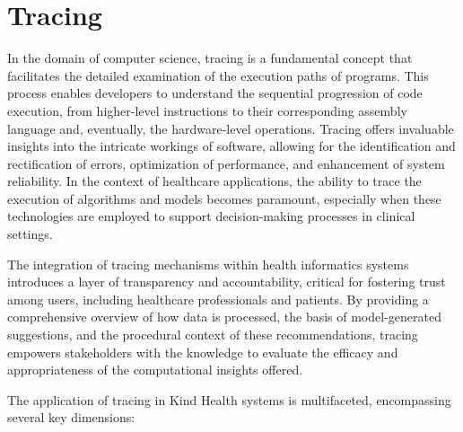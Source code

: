 \documentclass{article}
\begin{document}
\section{Tracing}

In the domain of computer science, tracing is a fundamental concept that facilitates the detailed examination of the execution paths of programs. This process enables developers to understand the sequential progression of code execution, from higher-level instructions to their corresponding assembly language and, eventually, the hardware-level operations. Tracing offers invaluable insights into the intricate workings of software, allowing for the identification and rectification of errors, optimization of performance, and enhancement of system reliability. In the context of healthcare applications, the ability to trace the execution of algorithms and models becomes paramount, especially when these technologies are employed to support decision-making processes in clinical settings.

The integration of tracing mechanisms within health informatics systems introduces a layer of transparency and accountability, critical for fostering trust among users, including healthcare professionals and patients. By providing a comprehensive overview of how data is processed, the basis of model-generated suggestions, and the procedural context of these recommendations, tracing empowers stakeholders with the knowledge to evaluate the efficacy and appropriateness of the computational insights offered.

The application of tracing in Kind Health systems is multifaceted, encompassing several key dimensions:
\end{document}
